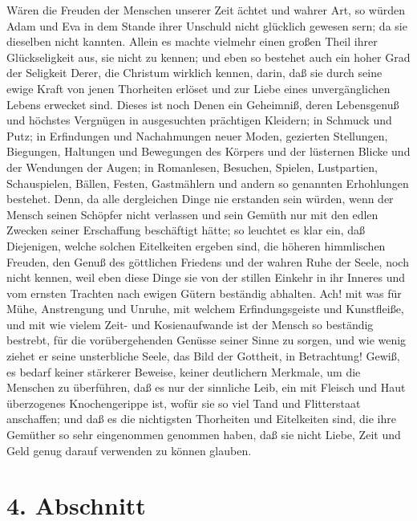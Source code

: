 Wären die Freuden der Menschen unserer Zeit ächtet und wahrer Art, so würden
Adam und Eva in dem Stande ihrer
Unschuld nicht glücklich gewesen sern; da sie
dieselben nicht kannten. Allein es machte vielmehr einen großen Theil ihrer
Glückseligkeit aus, sie nicht zu kennen; und eben so bestehet auch ein hoher
Grad der Seligkeit Derer, die Christum wirklich kennen, darin, daß sie durch
seine ewige Kraft von jenen Thorheiten erlöset und zur Liebe eines
unvergänglichen Lebens erwecket sind. Dieses ist noch Denen ein Geheimniß, deren
Lebensgenuß und höchstes Vergnügen in ausgesuchten prächtigen Kleidern; in
Schmuck und Putz; in Erfindungen und
Nachahmungen neuer Moden, gezierten
Stellungen, Biegungen, Haltungen und Bewegungen des Körpers und der lüsternen
Blicke und der Wendungen der Augen; in Romanlesen, Besuchen,
Spielen,
Lustpartien, Schauspielen, Bällen,
Festen, Gastmählern und andern so genannten
Erhohlungen bestehet. Denn, da alle dergleichen Dinge nie erstanden sein würden,
wenn der Mensch seinen Schöpfer nicht verlassen und sein Gemüth nur mit den
edlen Zwecken seiner Erschaffung beschäftigt hätte; so leuchtet es klar ein, daß
Diejenigen, welche solchen Eitelkeiten ergeben sind, die höheren himmlischen
Freuden, den Genuß des göttlichen Friedens und der wahren Ruhe der Seele, noch
nicht kennen, weil eben diese Dinge sie von der stillen Einkehr in ihr Inneres
und vom ernsten Trachten nach ewigen Gütern beständig abhalten. Ach! mit was für
Mühe, Anstrengung und Unruhe, mit welchem Erfindungsgeiste und Kunstfleiße, und
mit wie vielem Zeit- und Kosienaufwande ist der Mensch so beständig bestrebt,
für die vorübergehenden Genüsse seiner Sinne zu sorgen, und wie wenig ziehet er
seine unsterbliche Seele, das Bild der Gottheit, in Betrachtung! Gewiß, es
bedarf keiner stärkerer Beweise, keiner deutlichern Merkmale, um die Menschen zu
überführen, daß es nur der sinnliche Leib, ein mit Fleisch und Haut überzogenes
Knochengerippe ist, wofür sie so viel Tand und
Flitterstaat anschaffen; und daß
es die nichtigsten Thorheiten und Eitelkeiten sind, die ihre Gemüther so sehr
eingenommen genommen haben, daß sie nicht Liebe, Zeit und Geld genug darauf
verwenden zu können glauben.

\section{4. Abschnitt} \label{kap17_ab4}

